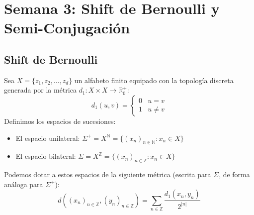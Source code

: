 
\chapter{Semana 3: Shift de Bernoulli y Semi-Conjugación}

\section{Shift de Bernoulli}

Sea $X = \{z_1, z_2, \dots, z_d\}$ un alfabeto finito equipado con la topología discreta generada por la métrica $d_1: X \times X \to \mathbb{R}^+_0$:
$$d_1(u, v) = \begin{cases} 0 & u = v \\ 1 & u \neq v \end{cases}$$
Definimos los espacios de sucesiones:
\begin{itemize}
	\item El espacio unilateral: $\Sigma^+ = X^{\mathbb{N}} = \{(x_n)_{n \in \mathbb{N}} : x_n \in X\}$
	\item El espacio bilateral: $\Sigma = X^{\mathbb{Z}} = \{(x_n)_{n \in \mathbb{Z}} : x_n \in X\}$
\end{itemize}

Podemos dotar a estos espacios de la siguiente métrica (escrita para $\Sigma$, de forma análoga para $\Sigma^+$):
$$d((x_n)_{n \in \mathbb{Z}}, (y_n)_{n \in \mathbb{Z}}) = \sum_{n \in \mathbb{Z}} \frac{d_1(x_n, y_n)}{2^{|n|}}$$

